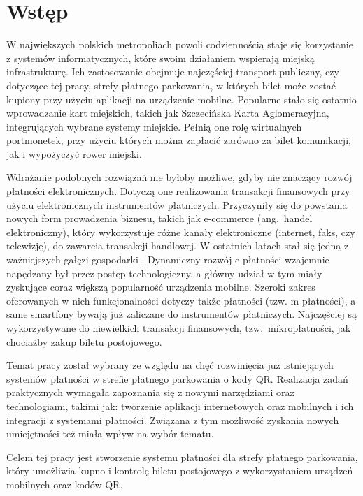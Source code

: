 \section*{Wstęp}

W największych polskich metropoliach powoli codziennością staje się korzystanie z systemów informatycznych, które swoim działaniem wspierają miejską infrastrukturę. Ich zastosowanie obejmuje
najczęściej transport publiczny, czy dotyczące tej pracy, strefy płatnego
parkowania, w których bilet może zostać kupiony przy użyciu aplikacji na urządzenie 
mobilne. Popularne stało się ostatnio wprowadzanie kart miejskich, takich jak 
Szczecińska Karta Aglomeracyjna, integrujących wybrane systemy miejskie. Pełnią 
one rolę wirtualnych portmonetek, przy użyciu których można zapłacić zarówno za 
bilet komunikacji, jak i wypożyczyć rower miejski. 

Wdrażanie podobnych rozwiązań nie byłoby możliwe, gdyby nie 
znaczący rozwój płatności elektronicznych. Dotyczą one 
realizowania transakcji finansowych przy użyciu elektronicznych instrumentów 
płatniczych. Przyczyniły się do powstania 
nowych form prowadzenia biznesu, takich jak e-commerce (ang.~handel elektroniczny), który wykorzystuje różne kanały elektroniczne (internet, faks, czy telewizję), do zawarcia transakcji handlowej. W ostatnich latach stał się jedną z ważniejszych gałęzi gospodarki 
\cite{barometr_radio}. Dynamiczny rozwój e-płatności 
wzajemnie napędzany był przez postęp technologiczny, a główny udział w tym miały 
zyskujące coraz większą popularność urządzenia mobilne. Szeroki zakres oferowanych w nich funkcjonalności 
dotyczy także płatności (tzw. m-płatności), a same smartfony bywają już 
zaliczane do instrumentów płatniczych. Najczęściej są wykorzystywane do 
niewielkich transakcji finansowych, tzw.~mikropłatności, jak chociażby zakup 
biletu postojowego.

Temat pracy został wybrany ze względu na chęć rozwinięcia już istniejących 
systemów płatności w strefie płatnego parkowania o kody QR. Realizacja zadań praktycznych wymagała zapoznania się 
z nowymi narzędziami oraz technologiami, takimi jak: tworzenie aplikacji 
internetowych oraz mobilnych i ich integracji z systemami płatności. Związana z 
tym możliwość zyskania nowych umiejętności też miała wpływ na wybór tematu.

Celem tej pracy jest stworzenie systemu płatności dla strefy płatnego 
parkowania, który umożliwia kupno i kontrolę biletu postojowego z 
wykorzystaniem urządzeń mobilnych oraz kodów QR.

